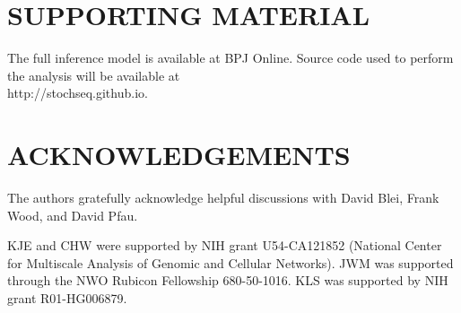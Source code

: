 \documentclass{biophys_letter}
\begin{document}
\section*{SUPPORTING MATERIAL}

The full inference model is available at BPJ Online. Source code used to perform the analysis will be available at \\http://stochseq.github.io.

\section*{ACKNOWLEDGEMENTS}

The authors gratefully acknowledge helpful discussions with David Blei, Frank Wood, and David Pfau.

KJE and CHW were supported by NIH grant U54-CA121852 (National Center for Multiscale Analysis of Genomic and Cellular Networks). JWM was supported through the NWO Rubicon Fellowship 680-50-1016. KLS was supported by NIH grant R01-HG006879.
\end{document}
